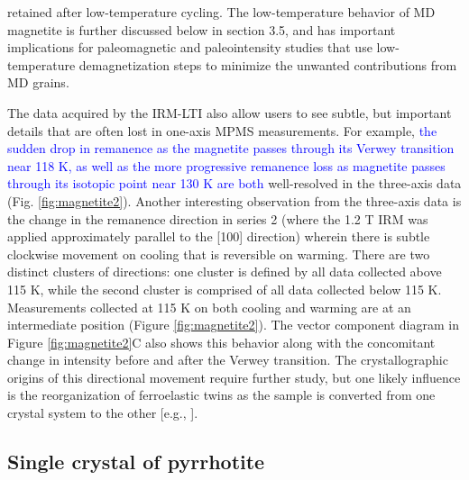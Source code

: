 \documentclass[draft,gc]{AGUTeX}
\begin{document}
\begin{article}
retained after low-temperature cycling. The low-temperature behavior of MD magnetite is further discussed below in section 3.5, and has important implications for paleomagnetic and paleointensity studies that use low-temperature demagnetization steps to minimize the unwanted contributions from MD grains. 

The data acquired by the IRM-LTI also allow users to see subtle, but important details that are often lost in one-axis MPMS measurements.  For example, \textcolor{blue}{the sudden drop in remanence as the magnetite passes through its Verwey transition near 118 K, as well as the more progressive remanence loss as magnetite passes through its isotopic point near 130 K are both} well-resolved in the three-axis data (Fig. \ref{fig:magnetite2}). Another interesting observation from the three-axis data is the change in the remanence direction in series 2 (where the 1.2 T  IRM was applied approximately parallel to the [100] direction) wherein there is subtle clockwise movement on cooling that is reversible on warming.  There are two distinct clusters of directions: one cluster is defined by all data collected above 115 K, while the second cluster is comprised of all data collected below 115 K.  Measurements collected at 115 K on both cooling and warming are at an intermediate position (Figure \ref{fig:magnetite2}). The vector component diagram in Figure \ref{fig:magnetite2}C also shows this behavior along with the concomitant change in intensity before and after the Verwey transition. The crystallographic origins of this directional movement require further study, but one likely influence is the reorganization of ferroelastic twins as the sample is converted from one crystal system to the other [e.g., \cite{Kasama2010a}].         

\subsection{Single crystal of pyrrhotite}


\end{article}
\end{document}
